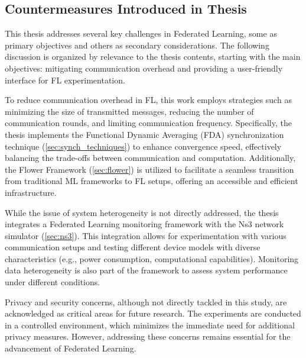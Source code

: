 \subsection{Countermeasures Introduced in Thesis}
This thesis addresses several key challenges in Federated Learning, some as primary objectives and others as secondary considerations.
The following discussion is organized by relevance to the thesis contents, starting with the main objectives: mitigating communication overhead and providing a
user-friendly interface for FL experimentation.

To reduce communication overhead in FL, this work employs strategies such as minimizing the size of transmitted messages, reducing
the number of communication rounds, and limiting communication frequency. Specifically, the thesis implements the Functional Dynamic
Averaging (FDA) synchronization technique (\cref{sec:synch_techniques}) to enhance convergence speed, effectively balancing the trade-offs
between communication and computation. Additionally, the Flower Framework (\cref{sec:flower}) is utilized to facilitate a seamless transition
from traditional ML frameworks to FL setups, offering an accessible and efficient infrastructure.

While the issue of system heterogeneity is not directly addressed, the thesis integrates a Federated Learning monitoring framework with the Ns3
network simulator (\cref{sec:ns3}). This integration allows for experimentation with various communication setups and testing different device
models with diverse characteristics (e.g., power consumption, computational capabilities). Monitoring data heterogeneity is also part of the
framework to assess system performance under different conditions.

Privacy and security concerns, although not directly tackled in this study, are acknowledged as critical areas for future research. The experiments
are conducted in a controlled environment, which minimizes the immediate need for additional privacy measures. However, addressing these concerns
remains essential for the advancement of Federated Learning.

